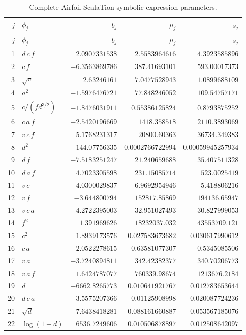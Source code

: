 \documentclass{article}
\begin{document}
{\scriptsize\setlength{\tabcolsep}{3pt}
\begin{longtable}{rlrrr}
\caption{Complete Airfoil ScalaTion symbolic expression parameters.}\label{tab:airfoil-symbolic-complete}\\
\toprule
$j$ & $\phi_j$ & $b_j$ & $\mu_j$ & $s_j$ \\
\midrule\endfirsthead
\toprule
$j$ & $\phi_j$ & $b_j$ & $\mu_j$ & $s_j$ \\
\midrule\endhead
1 & $d\,c\,f$ & $2.0907331538$ & $2.5583964616$ & $4.3923585896$ \\
2 & $c\,f$ & $-6.3563869786$ & $387.41693101$ & $593.00017373$ \\
3 & $\sqrt{v}$ & $2.63246161$ & $7.0477528943$ & $1.0899688109$ \\
4 & $a^{2}$ & $-1.5976476721$ & $77.848246052$ & $109.54757171$ \\
5 & $c/(f d^{3/2})$ & $-1.8476031911$ & $0.55386125824$ & $0.8793875252$ \\
6 & $c\,a\,f$ & $-2.5420196669$ & $1418.358518$ & $2110.3893069$ \\
7 & $v\,c\,f$ & $5.1768231317$ & $20800.60363$ & $36734.349383$ \\
8 & $d^{2}$ & $144.07756335$ & $0.0002766722994$ & $0.00059945257934$ \\
9 & $d\,f$ & $-7.5183251247$ & $21.240659688$ & $35.407511328$ \\
10 & $d\,a\,f$ & $4.7023305598$ & $231.15085714$ & $523.0025419$ \\
11 & $v\,c$ & $-4.0300029837$ & $6.9692954946$ & $5.418806216$ \\
12 & $v\,f$ & $-3.644800794$ & $152817.85869$ & $194136.65947$ \\
13 & $v\,c\,a$ & $4.2722395003$ & $32.951027493$ & $30.827999053$ \\
14 & $f^{2}$ & $1.391969626$ & $18232037.032$ & $43553709.121$ \\
15 & $c^{2}$ & $1.8939173576$ & $0.027583673682$ & $0.030617990612$ \\
16 & $c\,a$ & $-2.0522278615$ & $0.63581077307$ & $0.5345085506$ \\
17 & $v\,a$ & $-3.7240894811$ & $342.42382377$ & $340.70206773$ \\
18 & $v\,a\,f$ & $1.6424787077$ & $760339.98674$ & $1213676.2184$ \\
19 & $d$ & $-6662.8265773$ & $0.010641921767$ & $0.012783653644$ \\
20 & $d\,c\,a$ & $-3.5575207366$ & $0.01125908998$ & $0.020087724236$ \\
21 & $\sqrt{d}$ & $-7.6438418281$ & $0.088161660887$ & $0.053567185076$ \\
22 & $\log(1+d)$ & $6536.7249606$ & $0.010506878897$ & $0.012508642097$ \\
\bottomrule\end{longtable}}
\end{document}
